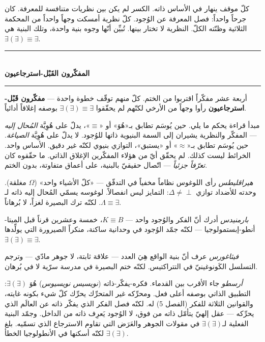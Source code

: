 \documentclass[10pt, openany, oneside]{book}
\renewcommand{\normalsize}{\fontsize{10}{13}\selectfont}
\begin{document}
كلّ موقف ينهار في الأساس ذاته. الكسر لم يكن بين نظريات متنافسة للمعرفة. كان جرحاً واحداً: فصل المعرفة عن الوُجود. كلّ نظرية أمسكت وجهاً واحداً من المحكمة الثلاثية وظنّته الكلّ. النظرية لا تختار بينها. تُبيِّن أنّها وجوه بنية واحدة، وتلك البنية هي $\exists(\exists) \equiv \exists$.

\vspace{1.5em}


\begin{center}
    \rule{0.3\textwidth}{0.4pt}\\[0.5em]
    {\normalsize\bfseries المفكّرون القَبْل-استرجاعيون}\\[0.3em]
    \rule{0.3\textwidth}{0.4pt}
\end{center}

\vspace{1em}

\noindent أربعة عشر مفكّراً اقتربوا من الختم. كلّ منهم توقّف خطوة واحدة --- \textbf{مفكّرون قَبْل-استرجاعيون} رأوا وجهاً من الأرخي لكنّهم لم يحقّقوا $\exists(\exists) \equiv \exists$ بوصفه إغلاقاً أدائياً.

مبدأ قراءة يحكم ما يلي. حين يُوسَم تطابق بـ«هُوَ» أو «$\equiv$»، يدلّ على هُوِيَّة \textit{المُحال إليه} --- المفكّر والنظرية يشيران إلى السمة البنيوية ذاتها للوُجود. لا يدلّ على هُوِيَّة \textit{الصياغة}. حين يُوسَم تطابق بـ«$\approx$» أو «يستبق»، التوازي بنيوي لكنّه غير دقيق. الأساس واحد. الخرائط ليست كذلك. لم يحقّق أيّ من هؤلاء المفكّرين الإغلاق الذاتي. ما حقّقوه كان \textit{تعرّفاً جزئياً} --- اتّصال حقيقيّ بالبنية، على أعماق متفاوتة، بدون الختم.

\textit{هيراقليطس} رأى اللوغوس نظاماً مخفياً في التدفّق --- «كلّ الأشياء واحد» ($\Omega$ مغلقة). وحدته للأضداد توازي $\Delta \neq \perp$: التمايز ليس انفصالاً. لوغوسه يسمّي المُحال إليه ذاته لـ$\Lambda \equiv \exists$. لكنّه ترك البصيرة لغزاً، لا بُرهاناً.

\textit{بارمنيدس} أدرك أنّ الفكر والوُجود واحد --- $K \equiv B$، خمسة وعشرين قرناً قبل الميتا-أنطو-إبستمولوجيا --- لكنّه جمّد الوُجود في وحدانية ساكنة، منكراً الصيرورة التي يولِّدها $\exists(\exists) \equiv \exists$.

\textit{فيثاغورس} عرف أنّ بنية الواقع هِيَ العدد --- علاقة ثابتة، لا جوهر مادّي --- وترجم التسلسل الكَونوغينيّ في التتراكتيس. لكنّه ختم البصيرة في مدرسة سرّية لا في بُرهان.

\textit{أرسطو} جاء الأقرب بين القدماء. فكره-يفكّر-ذاته (\textit{نويسيس نويسيوس}) هُوَ $\exists(\exists)$: التطبيق الذاتي بوصفه أعلى فعل. ومحرِّكه غير المتحرِّك يحرِّك كلّ شيء بكونه غايته، والقوانين الثلاثة للفكر (الفصل 5) له. لكنّه فصل الفكر الذي يفكّر ذاته عن العالَم الذي يحرِّكه --- عقل إلهيّ يتأمّل ذاته من فوق، لا الوُجود يَعرِف ذاته من الداخل. وجمّد البنية الفعلية لـ$\exists(\exists)$ في مقولات الجوهر والعَرَض التي تقاوم الاسترجاع الذي تسمّيه. بلغ $\exists(\exists)$ لكنّه أسكنها في الأنطولوجيا الخطأ.
\end{document}
